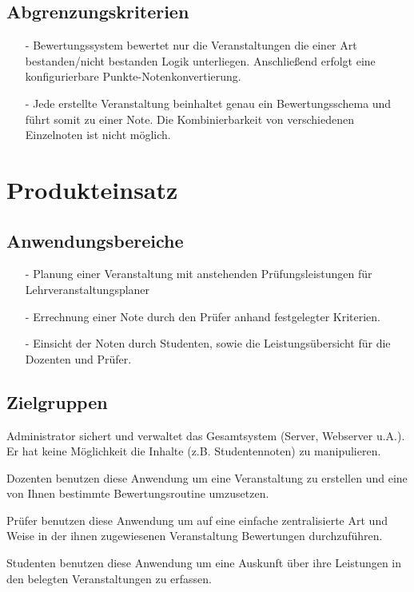 		\subsection{Abgrenzungskriterien}
		\begin{itemize}
		\item[-]	Bewertungssystem bewertet nur die Veranstaltungen die einer Art bestanden/nicht bestanden Logik unterliegen. Anschließend erfolgt eine konfigurierbare Punkte-Notenkonvertierung.
		\item[-]	Jede erstellte Veranstaltung beinhaltet genau ein Bewertungsschema und führt somit zu einer Note. Die Kombinierbarkeit von verschiedenen Einzelnoten ist nicht möglich.
		\end{itemize}
		
	\section{Produkteinsatz}
	
		
		\subsection{Anwendungsbereiche}
		\begin{itemize}
		\item[-]	Planung einer Veranstaltung mit anstehenden Prüfungsleistungen für Lehrveranstaltungsplaner
		\item[-]	Errechnung einer Note durch den Prüfer anhand festgelegter Kriterien.
		\item[-]	Einsicht der Noten durch Studenten, sowie die Leistungsübersicht für die Dozenten und Prüfer.
		\end{itemize}
		
		
		\subsection{Zielgruppen}
		
		\begin{description}
		\item[Administrator] 	 Administrator sichert und verwaltet das Gesamtsystem (Server, Webserver u.A.). Er hat keine Möglichkeit die Inhalte (z.B. Studentennoten) zu manipulieren. 
		\item[Dozent]	Dozenten benutzen diese Anwendung um eine Veranstaltung zu erstellen und eine von Ihnen bestimmte Bewertungsroutine umzusetzen.
		\item[Prüfer] Prüfer benutzen diese Anwendung um auf eine einfache zentralisierte Art und Weise in der ihnen zugewiesenen Veranstaltung Bewertungen durchzuführen.
		\item[Studenten]	Studenten benutzen diese Anwendung um eine Auskunft über ihre Leistungen in den belegten Veranstaltungen zu erfassen.
		\end{description}

